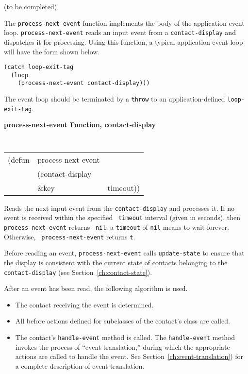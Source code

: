 (to be completed)

{\samepage
{}
The {\tt process-next-event} function implements the body of the application event
loop.
{\tt process-next-event} reads an input
event from a {\tt contact-display} and
dispatches it for processing.
Using this function, a typical application event loop will have the form shown
below. 
}

\begin{verbatim}
(catch loop-exit-tag 
  (loop 
    (process-next-event contact-display)))
\end{verbatim}

The event loop should be terminated by a {\tt throw} to an application-defined 
{\tt loop-exit-tag}.


{\large {\bf process-next-event \hfill Function, contact-display}}
\begin{flushright} \parbox[t]{6.125in}{
\tt
\begin{tabular}{lll}
\raggedright
(defun & process-next-event & \\
& (contact-display\\
& \&key & timeout))
\end{tabular}
\rm

}\end{flushright}

\begin{flushright} \parbox[t]{6.125in}{
Reads the next input event  from the {\tt contact-display} and processes it. If no
event is received within the specified {\tt
timeout} interval (given in seconds), then {\tt process-next-event} returns {\tt
nil}; a {\tt timeout} of {\tt nil} means to wait forever. Otherwise, {\tt
process-next-event} returns {\tt t}.

Before reading an event, {\tt process-next-event} calls {\tt update-state} to
ensure that the display is consistent with the current state of contacts
belonging to the {\tt contact-display} (see Section~\ref{ch:contact-state}).

After an event has been read, the following algorithm is used.
\begin{itemize}
\item  The contact receiving the event is determined.
\item  All  before actions defined
for subclasses of the contact's class are called.  
\item The contact's {\tt handle-event}
method is called. The {\tt handle-event} method invokes the process of
``event translation,''
during which the appropriate actions are called to handle the event. See
Section~\ref{ch:event-translation}) for a complete description of event translation.
\end{itemize} }\end{flushright}



